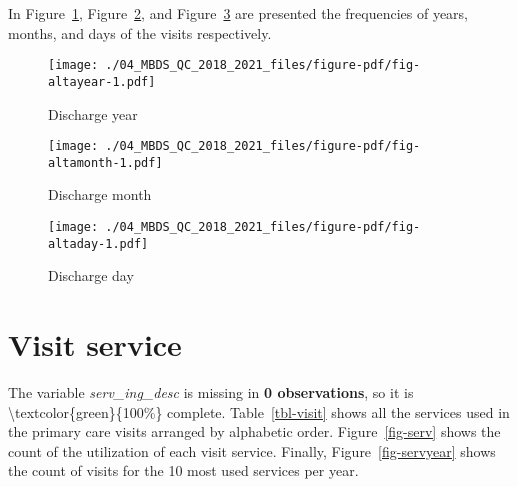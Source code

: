 \documentclass[
  letterpaper,
  DIV=11,
  numbers=noendperiod]{scrreprt}
\begin{document}
In Figure~\ref{fig-altayear}, Figure~\ref{fig-altamonth}, and
Figure~\ref{fig-altaday} are presented the frequencies of years, months,
and days of the visits respectively.

\begin{figure}

{\centering \texttt{[image: ./04\_MBDS\_QC\_2018\_2021\_files/figure-pdf/fig-altayear-1.pdf]}

}

\caption{\label{fig-altayear}Discharge year}

\end{figure}

\begin{figure}

{\centering \texttt{[image: ./04\_MBDS\_QC\_2018\_2021\_files/figure-pdf/fig-altamonth-1.pdf]}

}

\caption{\label{fig-altamonth}Discharge month}

\end{figure}

\begin{figure}

{\centering \texttt{[image: ./04\_MBDS\_QC\_2018\_2021\_files/figure-pdf/fig-altaday-1.pdf]}

}

\caption{\label{fig-altaday}Discharge day}

\end{figure}

\hypertarget{visit-service-1}{%
\section{Visit service}\label{visit-service-1}}

The variable \emph{serv\_ing\_desc} is missing in \textbf{0
observations}, so it is \textbackslash textcolor\{green\}\{100\%\}
complete. Table~\ref{tbl-visit} shows all the services used in the
primary care visits arranged by alphabetic order. Figure~\ref{fig-serv}
shows the count of the utilization of each visit service. Finally,
Figure~\ref{fig-servyear} shows the count of visits for the 10 most used
services per year.
\end{document}
